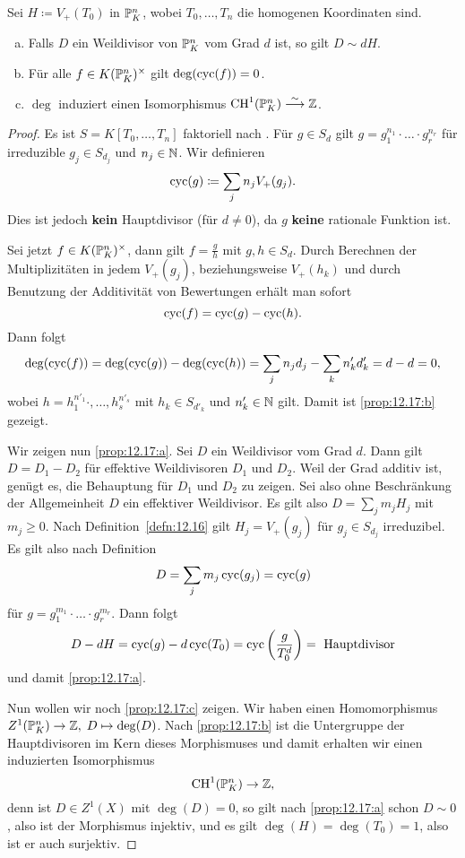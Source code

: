 \begin{prop}
\label{prop:12.17}
	Sei $H \coloneqq V_+(T_0)$ in $\P^n_K$, wobei $T_0,\ldots,T_n$ die homogenen Koordinaten sind.
	\begin{enumerate}[a)]
		\item\label{prop:12.17:a} Falls $D$ ein Weildivisor von $\P^n_K$ vom Grad $d$ ist, so gilt $D\sim dH$.
		\item\label{prop:12.17:b} Für alle $f \in K(\P^n_K)^\times$ gilt $\deg(\cyc(f)) = 0$.
		\item\label{prop:12.17:c} $\deg$ induziert einen Isomorphismus $\CH^1(\P^n_K)\simto \Z$.
	\end{enumerate}
	\begin{proof}
		Es ist $S=K[T_0,\ldots,T_n]$ faktoriell nach \cite[Theorem~A.3]{gubler2014vorlesungsskript}. Für $g \in S_d$ gilt $g=g_1^{n_1}\cdot \ldots \cdot g_r^{n_r}$ für irreduzible $g_j\in S_{d_j}$ und $n_j \in \N$. Wir definieren
		\[
			\cyc(g)\coloneqq \sum_{j}n_jV_+(g_j).
		\]
		Dies ist jedoch \textbf{kein} Hauptdivisor (für $d \ne 0$), da $g$ \textbf{keine} rationale Funktion ist.

		Sei jetzt $f\in K(\P^n_K)^\times$, dann gilt $f=\frac{g}{h}$ mit $g,h\in S_d$. Durch Berechnen der Multiplizitäten in jedem $V_+(g_j)$, beziehungsweise $V_+(h_k)$ und durch Benutzung der Additivität von Bewertungen erhält man sofort
		\[
			\cyc(f) = \cyc(g) - \cyc(h).
		\]
		Dann folgt
		\[
			\deg(\cyc(f)) = \deg(\cyc(g)) - \deg(\cyc(h)) = \sum_j n_j d_j - \sum_k n_k'd_k' = d - d = 0,
		\]
		wobei $h = h_1^{n'_1}\cdot,\ldots,h_s^{n'_s}$ mit $h_k \in S_{d'_k}$ und $n'_k \in \N$ gilt. Damit ist \ref{prop:12.17:b} gezeigt.

		Wir zeigen nun \ref{prop:12.17:a}. Sei $D$ ein Weildivisor vom Grad $d$. Dann gilt $D=D_1-D_2$ für effektive Weildivisoren $D_1$ und $D_2$. Weil der Grad additiv ist, genügt es, die Behauptung für $D_1$ und $D_2$ zu zeigen. Sei also ohne Beschränkung der Allgemeinheit $D$ ein effektiver Weildivisor. Es gilt also $D = \sum_{j} m_j H_j$ mit $m_j\ge 0$. Nach Definition~\ref{defn:12.16} gilt $H_j=V_+(g_j)$ für $g_j \in S_{d_j}$ irreduzibel. Es gilt also nach Definition
		\[
			D = \sum_{j}m_j \cyc(g_j) = \cyc(g)
		\]
		für $g = g_1^{m_1}\cdot \ldots \cdot g_r^{m_r}$. Dann folgt
		\[
			D-dH = \cyc(g) - d \cyc(T_0) = \cyc\left(\frac{g}{T_0^d}\right) = \text{ Hauptdivisor}
		\]
		und damit \ref{prop:12.17:a}.

		Nun wollen wir noch \ref{prop:12.17:c} zeigen. Wir haben einen Homomorphismus $Z^1(\P^n_K) \to \Z,\; D \mapsto \deg(D)$. Nach \ref{prop:12.17:b} ist die Untergruppe der Hauptdivisoren im Kern dieses Morphismuses und damit erhalten wir einen induzierten Isomorphismus
		\[
			\CH^1(\P^n_K)\to \Z,
		\]
		denn ist $D \in Z^1(X)$ mit $\deg(D) = 0$, so gilt nach \ref{prop:12.17:a} schon $D \sim 0$, also ist der Morphismus injektiv, und es gilt $\deg(H) = \deg(T_0)=1$, also ist er auch surjektiv.
	\end{proof}
\end{prop}

